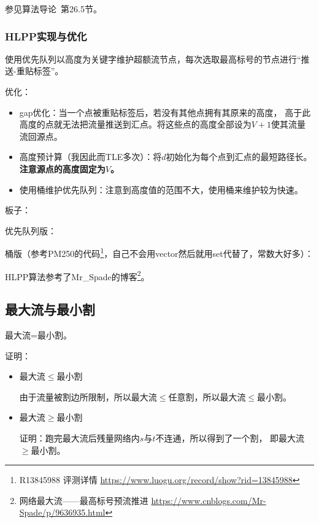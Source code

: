 参见算法导论\cite{ITA3}~第26.5节。

\subsubsection{HLPP实现与优化}

使用优先队列以高度为关键字维护超额流节点，每次选取最高标号的节点进行``推送-重贴标签''。

优化：
\begin{itemize}
	\item gap优化：当一个点被重贴标签后，若没有其他点拥有其原来的高度，
	高于此高度的点就无法把流量推送到汇点。将这些点的高度全部设为$V+1$使其流量
	流回源点。
	\item 高度预计算（我因此而TLE多次）：将$d$初始化为每个点到汇点的最短路径长。
	{\bfseries 注意源点的高度固定为$V$。}
	\item 使用桶维护优先队列：注意到高度值的范围不大，使用桶来维护较为快速。
\end{itemize}

板子：

优先队列版：


桶版（参考PM250的代码\footnote{
	R13845988 评测详情
	\url{https://www.luogu.org/record/show?rid=13845988}
}，自己不会用vector然后就用set代替了，常数大好多）：


HLPP算法参考了Mr\_Spade的博客\footnote{
	网络最大流——最高标号预流推进
	\url{https://www.cnblogs.com/Mr-Spade/p/9636935.html}
}。

\subsection{最大流与最小割}

\begin{theorem}\label{MFMCT}
	最大流=最小割。
\end{theorem}

证明：
\begin{itemize}
	\item
	\begin{lemma}\label{MCA}
		最大流$\leq$最小割
	\end{lemma}
	由于流量被割边所限制，所以最大流$\leq$任意割，所以最大流$\leq$最小割。
	\item
	\begin{lemma}\label{MCB}
		最大流$\geq$最小割
	\end{lemma}
	证明：跑完最大流后残量网络内$s$与$t$不连通，所以得到了一个割，
	即最大流$\geq$最小割。
\end{itemize}

